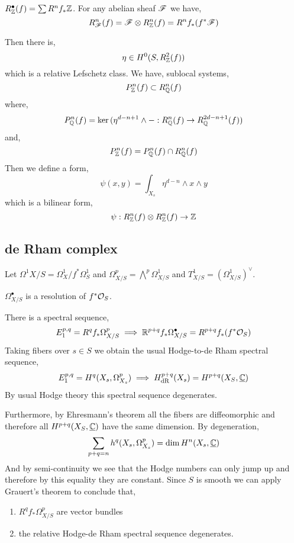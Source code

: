 \documentclass[12pt]{article}
\begin{document}
\begin{defn}
$R^\bullet_{\mathbb{Z}}(f) = \sum R^n f_* \mathbb{Z}$. For any abelian sheaf $\mathscr{F}$ we have,
\[ R^n_{\mathscr{F}} (f) = \mathscr{F} \otimes R^n_{\mathbb{Z}} (f) = R^n f_* (f^* \mathscr{F}) \]
\end{defn}

Then there is,
\[ \eta \in H^0(S, R^2_{\mathbb{Z}}(f)) \]
which is a relative Lefschetz class. We have, sublocal systems,
\[ P^n_{\mathbb{Z}}(f) \subset R^n_{\mathbb{Q}}(f) \]
where,
\[ P^n_{\mathbb{Q}}(f) = \ker{(\eta^{d - n + 1} \wedge - : R^n_{\mathbb{Q}}(f) \to R^{2d - n + 1}_{\mathbb{Q}}(f))} \]
and,
\[ P^n_{\mathbb{Z}}(f) = P^n_{\mathbb{Q}}(f) \cap R^n_{\mathbb{Q}}(f) \]
Then we define a form,
\[ \psi(x,y) = \int_{X_s} \eta^{d-n} \wedge x \wedge y \]
which is a bilinear form,
\[ \psi : R^n_{\mathbb{Z}}(f) \otimes R^n_{\mathbb{Z}}(f) \to \mathbb{Z} \]

\subsection{de Rham complex}

Let $\Omega^1{X/S} =  \Omega^1_X / f^* \Omega^1_S$ and $\Omega^p_{X/S} = \bigwedge^p \Omega^1_{X/S}$ and $T^1_{X/S} = (\Omega^1_{X/S})^\vee$.

\begin{prop}
$\Omega^\bullet_{X/S}$ is a resolution of $f^* \mathcal{O}_{S}$.
\end{prop} 

\begin{prop}
There is a spectral sequence,
\[ E^{p,q}_1 = R^q f_* \Omega^p_{X/S} \implies \mathbb{R}^{p+q} f_* \Omega^\bullet_{X/S} = R^{p+q} f_* (f^* \mathcal{O}_{S}) \]
Taking fibers over $s \in S$ we obtain the usual Hodge-to-de Rham spectral sequence,
\[ E^{p,q}_1 = H^q(X_s, \Omega^p_{X_s}) \implies H^{p+q}_{\mathrm{dR}}(X_s) = H^{p+q}(X_S, \underline{\mathbb{C}}) \]
By usual Hodge theory this spectral sequence degenerates. 
\end{prop}

Furthermore, by Ehresmann's theorem all the fibers are diffeomorphic and therefore all $H^{p+q}(X_S, \underline{\mathbb{C}})$ have the same dimension. By degeneration,
\[ \sum_{p+q = n} h^q(X_s, \Omega^p_{X_s}) = \dim{H^n(X_s, \underline{\mathbb{C}})} \]
And by semi-continuity we see that the Hodge numbers can only jump up and therefore by this equality they are constant. Since $S$ is smooth we can apply Grauert's theorem to conclude that,
\begin{enumerate}
\item $R^q f_* \Omega^p_{X/S}$ are vector bundles
\item the relative Hodge-de Rham spectral sequence degenerates. 
\end{enumerate}
\end{document}
